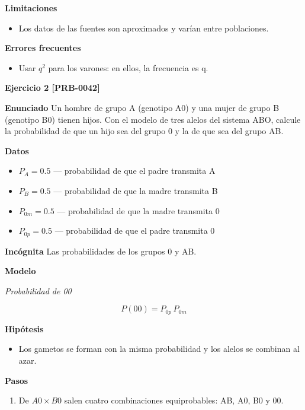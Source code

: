 \documentclass{book}
\begin{document}
\noindent\textbf{Limitaciones}
\begin{itemize}
\item Los datos de las fuentes son aproximados y varían entre poblaciones.
\end{itemize}

\noindent\textbf{Errores frecuentes}
\begin{itemize}
\item Usar \(q^{2}\) para los varones: en ellos, la frecuencia es q.
\end{itemize}

\noindent\textbf{Ejercicio 2 [PRB-0042]}

\noindent\textbf{Enunciado}
Un hombre de grupo A (genotipo A0) y una mujer de grupo B (genotipo B0) tienen hijos. Con el modelo de tres alelos del sistema ABO, calcule la probabilidad de que un hijo sea del grupo 0 y la de que sea del grupo AB.


\noindent\textbf{Datos}
\begin{itemize}
\item $P_{A} = 0.5$ — probabilidad de que el padre transmita A
\item $P_{B} = 0.5$ — probabilidad de que la madre transmita B
\item $P_{0m} = 0.5$ — probabilidad de que la madre transmita 0
\item $P_{0p} = 0.5$ — probabilidad de que el padre transmita 0
\end{itemize}

\noindent\textbf{Incógnita}
Las probabilidades de los grupos 0 y AB.


\noindent\textbf{Modelo}

\noindent\textit{Probabilidad de 00}

\[
P(00) = P_{0p}\,P_{0m}
\]

\noindent\textbf{Hipótesis}
\begin{itemize}
\item Los gametos se forman con la misma probabilidad y los alelos se combinan al azar.
\end{itemize}

\noindent\textbf{Pasos}
\begin{enumerate}
\item
De \(A0 \times B0\) salen cuatro combinaciones equiprobables: AB, A0, B0 y 00.

\end{enumerate}
\end{document}
